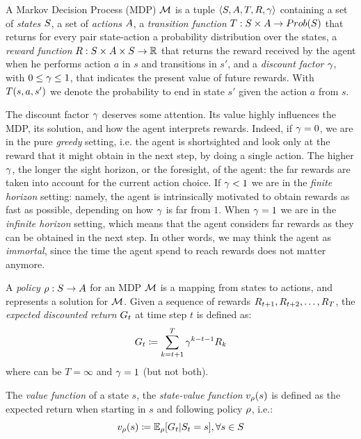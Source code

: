 A Markov Decision Process (MDP) $\mathcal{M}$ is a tuple $\langle S, A, T, R, \gamma \rangle$ containing a set of \emph{states} $S$, a set of \emph{actions} $A$, a \emph{transition function} $T: S \times A \to Prob(S)$ that returns for every pair state-action a probability distribution over the states, a \emph{reward function} $R: S \times A \times S \to \mathbb{R}$ that returns the reward received by the agent when he performs action $a$ in $s$ and transitions in $s'$, and a \emph{discount factor} $\gamma$, with $0 \le \gamma \le 1$, that indicates the present value of future rewards. With $T(s, a, s')$ we denote the probability to end in state $s'$ given the action $a$ from $s$.

The discount factor $\gamma$ deserves some attention. Its value highly influences the MDP, its solution, and how the agent interprets rewards. Indeed, if $\gamma = 0$, we are in the pure \emph{greedy} setting, i.e. the agent is shortsighted and look only at the reward that it might obtain in the next step, by doing a single action. The higher $\gamma$, the longer the sight horizon, or the foresight, of the agent: the far rewards are taken into account for the  current action choice. If $\gamma < 1$ we are in the \emph{finite horizon} setting: namely, the agent is intrinsically motivated to obtain rewards as fast as possible, depending on how $\gamma$ is far from $1$. When $\gamma = 1$ we are in the \emph{infinite horizon} setting, which means that the agent considers far rewards as they can be obtained in the next step. In other words, we may think the agent as \emph{immortal}, since the time the agent spend to reach rewards does not matter anymore.

\medskip
A \emph{policy} $\rho: S \to A$ for an MDP $\mathcal{M}$ is a mapping from states to actions, and represents a solution for $\mathcal{M}$. Given a sequence of rewards $R_{t+1}, R_{t+2}, \dots, R_{T}$, the \emph{expected discounted return} $G_t$ at time step $t$
is defined as: 
\begin{equation}\label{def:expected-discounted-return}
G_t \coloneqq \sum_{k=t+1}^T \gamma^{k-t-1}R_k
\end{equation} where can be $T = \infty$ and $\gamma = 1$ (but not both). 

The \emph{value function} of a state $s$, the \emph{state-value function} $v_\rho(s)$ is defined as the expected return when starting in $s$ and following policy $\rho$, i.e.:
\begin{equation}
\label{def:state-value-fun}
v_\rho(s) \coloneqq \mathbb{E}_{\rho}[G_t | S_t = s], \forall s \in S
\end{equation}

